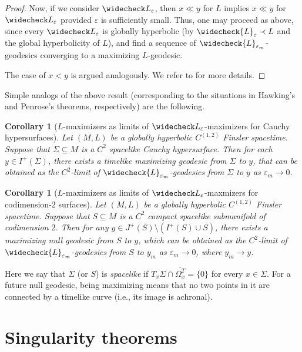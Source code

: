 \documentclass[a4paper,11pt]{article}
\numberwithin{equation}{section}
\theoremstyle{definition}
\theoremstyle{plain}
\newtheorem{Corollary}[Definition]{Corollary}
\newcommand{\eps}{\varepsilon}
\begin{document}
\begin{proof}
    Now, if we consider $\widecheck L_\eps$, then $x \ll y$ for $L$ implies $x \ll y$ for $\widecheck L_\eps$ provided $\eps$ is sufficiently small. 
    Thus, one may proceed as above, since every $\widecheck L_\eps$ is globally hyperbolic (by $\widecheck{L}_\eps \prec L$ and the global hyperbolicity of $L$), and find a sequence of $\widecheck{L}_{\eps_m}$-geodesics converging to a maximizing $L$-geodesic. 

    The case of $x < y$ is argued analogously. 
    We refer to \cite[Prop.\ 2.13]{Graf-SingularityC1} for more details. 
\end{proof}

Simple analogs of the above result (corresponding to the situations in Hawking's and Penrose's theorems, respectively) are the following.

\begin{Corollary}[$L$-maximizers as limits of $\widecheck L_\varepsilon$-maximizers for Cauchy hypersurfaces]
\label{Corollary: hypersurfacemaxaslimit}
    Let $(M,L)$ be a globally hyperbolic $C^{(1,2)}$ Finsler spacetime. 
    Suppose that $\Sigma \subseteq M$ is a $C^2$ spacelike Cauchy hypersurface. 
    Then for each $y \in I^+(\Sigma)$, there exists a timelike maximizing geodesic from $\Sigma$ to $y$, that can be obtained as the $C^2$-limit of $\widecheck{L}_{\eps_m}$-geodesics from $\Sigma$ to $y$ as $\eps_m \to 0$.
\end{Corollary}

\begin{Corollary}[$L$-maximizers as limits of $\widecheck L_\varepsilon$-maxmizers for codimension-$2$ surfaces]
\label{Corollary: Trappedsurfacemaxaslimit}
    Let $(M,L)$ be a globally hyperbolic $C^{(1,2)}$ Finsler spacetime. 
    Suppose that $S \subseteq M$ is a $C^2$ compact spacelike submanifold of codimension $2$. 
    Then for any $y \in J^+(S) \setminus (I^+(S) \cup S)$, there exists a maximizing null geodesic from $S$ to $y$, which can be obtained as the $C^2$-limit of $\widecheck{L}_{\eps_m}$-geodesics from $S$ to $y_m$ as $\eps_m \to 0$, where $y_m \to y$.
\end{Corollary}

Here we say that $\Sigma$ (or $S$) is \emph{spacelike} if $T_x \Sigma \cap \overline{\Omega_x^T} =\{0\}$ for every $x \in \Sigma$. 
For a future null geodesic, being maximizing means that no two points in it are connected by a timelike curve (i.e., its image is achronal).


\section{Singularity theorems}
\label{section: singularity theorems}
\end{document}
